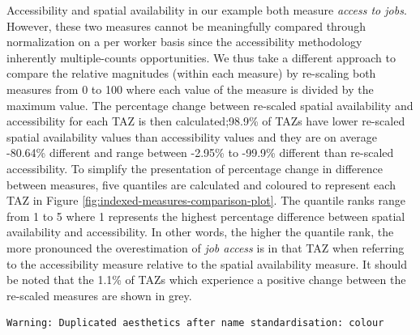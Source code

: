 \documentclass[]{elsarticle} %
\begin{document}
Accessibility and spatial availability in our example both measure
\emph{access to jobs}. However, these two measures cannot be
meaningfully compared through normalization on a per worker basis since
the accessibility methodology inherently multiple-counts opportunities.
We thus take a different approach to compare the relative magnitudes
(within each measure) by re-scaling both measures from 0 to 100 where
each value of the measure is divided by the maximum value. The
percentage change between re-scaled spatial availability and
accessibility for each TAZ is then calculated;98.9\% of TAZs have lower
re-scaled spatial availability values than accessibility values and they
are on average -80.64\% different and range between -2.95\% to -99.9\%
different than re-scaled accessibility. To simplify the presentation of
percentage change in difference between measures, five quantiles are
calculated and coloured to represent each TAZ in Figure
\ref{fig:indexed-measures-comparison-plot}. The quantile ranks range
from 1 to 5 where 1 represents the highest percentage difference between
spatial availability and accessibility. In other words, the higher the
quantile rank, the more pronounced the overestimation of \emph{job
access} is in that TAZ when referring to the accessibility measure
relative to the spatial availability measure. It should be noted that
the 1.1\% of TAZs which experience a positive change between the
re-scaled measures are shown in grey.

\begin{verbatim}
Warning: Duplicated aesthetics after name standardisation: colour
\end{verbatim}
\end{document}
